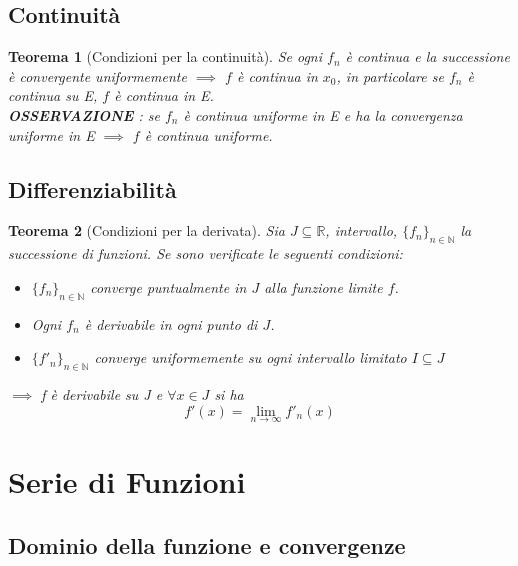 \documentclass[a4paper]{article}
\newcommand{\numberset}{\mathbb}
\newcommand{\N}{\numberset{N}}
\newcommand{\R}{\numberset{R}}
\theoremstyle{plain}
\newtheorem{Teo}{Teorema}
\begin{document}
\subsection{Continuità}

\begin{Teo} [Condizioni per la continuità] 
    Se ogni $f_n$ è continua e la successione è convergente uniformemente $\implies$ $f$ è continua 
    in $x_0$, in particolare se $f_n$ è continua su E, $f$ è continua in E.\\
    \textbf{OSSERVAZIONE} : se $f_n$ è continua uniforme in E e ha la convergenza uniforme in E
    $\implies$ $f$ è continua uniforme. 
\end{Teo}

\subsection{Differenziabilità}

\begin{Teo}[Condizioni per la derivata]
    Sia $J\subseteq\R$, intervallo, $\{f_n\}_{n\in\N}$ la successione di funzioni.
    Se sono verificate le seguenti condizioni:
    \begin{itemize}
        \item $\{f_n\}_{n\in\N}$ converge puntualmente in $J$ alla funzione limite $f$.
        \item Ogni $f_n$ è derivabile in ogni punto di $J$.
        \item $\{f'_n\}_{n\in\N}$ converge uniformemente su ogni intervallo limitato $I\subseteq J$
    \end{itemize}
    $\implies$ f è derivabile su J e $\forall x \in J$ si ha 
    \begin{equation*} 
        f'(x)=\lim_{n\to\infty}{f'_n(x)}
    \end{equation*} 

\end{Teo}

\section {Serie di Funzioni}

\subsection{Dominio della funzione e convergenze}
\end{document}
